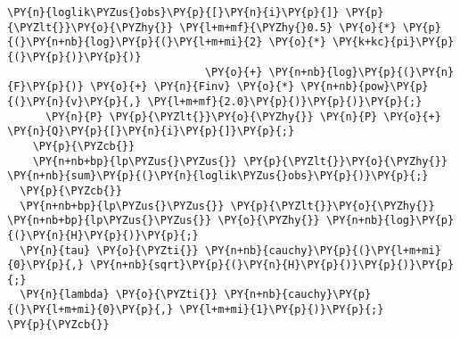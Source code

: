 \begin{Verbatim}[commandchars=\\\{\}]
      \PY{n}{loglik\PYZus{}obs}\PY{p}{[}\PY{n}{i}\PY{p}{]} \PY{p}{\PYZlt{}}\PY{o}{\PYZhy{}} \PY{l+m+mf}{\PYZhy{}0.5} \PY{o}{*} \PY{p}{(}\PY{n+nb}{log}\PY{p}{(}\PY{l+m+mi}{2} \PY{o}{*} \PY{k+kc}{pi}\PY{p}{(}\PY{p}{)}\PY{p}{)}
                               \PY{o}{+} \PY{n+nb}{log}\PY{p}{(}\PY{n}{F}\PY{p}{)} \PY{o}{+} \PY{n}{Finv} \PY{o}{*} \PY{n+nb}{pow}\PY{p}{(}\PY{n}{v}\PY{p}{,} \PY{l+m+mf}{2.0}\PY{p}{)}\PY{p}{)}\PY{p}{;}
      \PY{n}{P} \PY{p}{\PYZlt{}}\PY{o}{\PYZhy{}} \PY{n}{P} \PY{o}{+} \PY{n}{Q}\PY{p}{[}\PY{n}{i}\PY{p}{]}\PY{p}{;}
    \PY{p}{\PYZcb{}}
    \PY{n+nb+bp}{lp\PYZus{}\PYZus{}} \PY{p}{\PYZlt{}}\PY{o}{\PYZhy{}} \PY{n+nb}{sum}\PY{p}{(}\PY{n}{loglik\PYZus{}obs}\PY{p}{)}\PY{p}{;}
  \PY{p}{\PYZcb{}}
  \PY{n+nb+bp}{lp\PYZus{}\PYZus{}} \PY{p}{\PYZlt{}}\PY{o}{\PYZhy{}} \PY{n+nb+bp}{lp\PYZus{}\PYZus{}} \PY{o}{\PYZhy{}} \PY{n+nb}{log}\PY{p}{(}\PY{n}{H}\PY{p}{)}\PY{p}{;}
  \PY{n}{tau} \PY{o}{\PYZti{}} \PY{n+nb}{cauchy}\PY{p}{(}\PY{l+m+mi}{0}\PY{p}{,} \PY{n+nb}{sqrt}\PY{p}{(}\PY{n}{H}\PY{p}{)}\PY{p}{)}\PY{p}{;}
  \PY{n}{lambda} \PY{o}{\PYZti{}} \PY{n+nb}{cauchy}\PY{p}{(}\PY{l+m+mi}{0}\PY{p}{,} \PY{l+m+mi}{1}\PY{p}{)}\PY{p}{;}
\PY{p}{\PYZcb{}}
\end{Verbatim}
